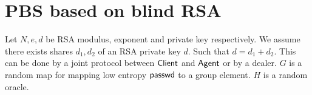 \appendix
\section{PBS based on blind RSA}
Let $N, e, d$ be RSA modulus, exponent and private key respectively. We assume there exists shares $d_1, d_2$ of an RSA private key $d$. Such that $d = d_1 + d_2$. This can be done by a joint protocol between $\textsf{Client}$ and $\textsf{Agent}$ or by a dealer. $G$ is a random map for mapping low entropy $\textsf{passwd}$ to a group element. $H$ is a random oracle.


